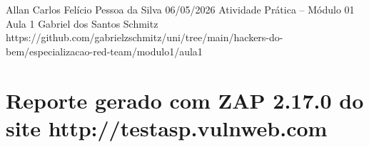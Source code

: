 \documentclass{article}
\begin{document}
{Allan Carlos Felício Pessoa da Silva}
{06/05/2026}
{Atividade Prática -- Módulo 01}
{Aula 1}
{Gabriel dos Santos Schmitz}
{https://github.com/gabrielzschmitz/uni/tree/main/hackers-do-bem/especializacao-red-team/modulo1/aula1}


\newpage

\section{Reporte gerado com ZAP 2.17.0 do site http://testasp.vulnweb.com}
\newpage


\newpage
\printbibliography[title=Referências]
\end{document}
